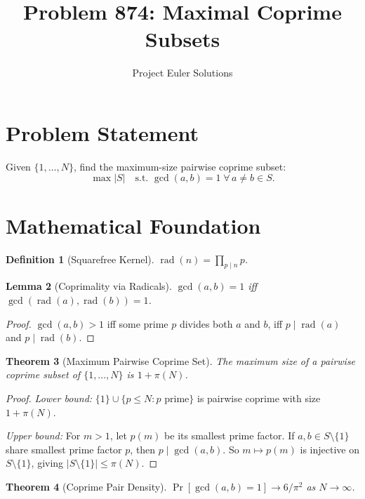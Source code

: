 \documentclass[11pt]{article}
\title{Problem 874: Maximal Coprime Subsets}
\author{Project Euler Solutions}
\date{}
\newtheorem{theorem}{Theorem}
\newtheorem{lemma}[theorem]{Lemma}
\newtheorem{definition}[theorem]{Definition}
\begin{document}
\maketitle

\section{Problem Statement}

Given $\{1,\ldots,N\}$, find the maximum-size pairwise coprime subset:
\[
\max |S| \quad \text{s.t.\ } \gcd(a,b)=1 \;\forall\, a \neq b \in S.
\]

\section{Mathematical Foundation}

\begin{definition}[Squarefree Kernel]
$\operatorname{rad}(n) = \prod_{p \mid n} p$.
\end{definition}

\begin{lemma}[Coprimality via Radicals]
$\gcd(a,b) = 1$ iff $\gcd(\operatorname{rad}(a), \operatorname{rad}(b)) = 1$.
\end{lemma}

\begin{proof}
$\gcd(a,b)>1$ iff some prime $p$ divides both $a$ and $b$, iff $p \mid \operatorname{rad}(a)$ and $p \mid \operatorname{rad}(b)$.
\end{proof}

\begin{theorem}[Maximum Pairwise Coprime Set]
The maximum size of a pairwise coprime subset of $\{1,\ldots,N\}$ is $1 + \pi(N)$.
\end{theorem}

\begin{proof}
\emph{Lower bound:} $\{1\} \cup \{p \le N : p \text{ prime}\}$ is pairwise coprime with size $1 + \pi(N)$.

\emph{Upper bound:} For $m > 1$, let $p(m)$ be its smallest prime factor. If $a,b \in S \setminus\{1\}$ share smallest prime factor $p$, then $p \mid \gcd(a,b)$. So $m \mapsto p(m)$ is injective on $S \setminus\{1\}$, giving $|S\setminus\{1\}| \le \pi(N)$.
\end{proof}

\begin{theorem}[Coprime Pair Density]
$\Pr[\gcd(a,b)=1] \to 6/\pi^2$ as $N \to \infty$.
\end{theorem}
\end{document}
